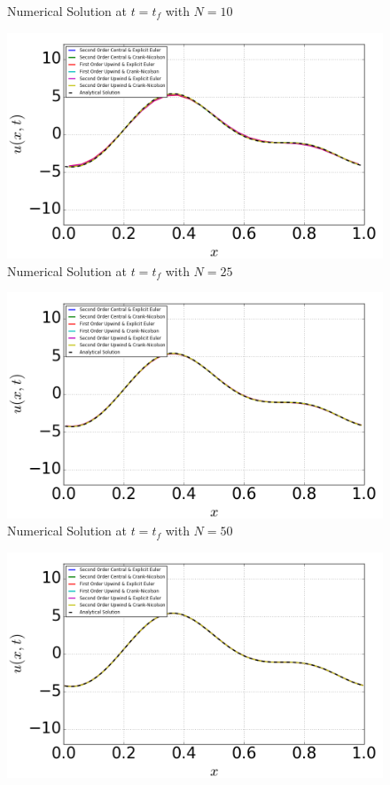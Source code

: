 \documentclass[12pt]{article}
\newenvironment{problem}[2][Problem]{\begin{trivlist}
\item[\hskip \labelsep {\bfseries #1}\hskip \labelsep {\bfseries #2.}]}{\end{trivlist}}
\begin{document}
\begin{problem}{2}
\begin{figure}[H]
 \caption{Numerical Solution at $t=t_f$ with $N=10$}
\label{label}
\end{figure}
\begin{figure}[H]
\centering
  \includegraphics[scale=0.65]{p2b_n25.png}
 \caption{Numerical Solution at $t=t_f$ with $N=25$}
\label{label}
\end{figure}
\begin{figure}[H]
\centering
  \includegraphics[scale=0.65]{p2b_n50.png}
 \caption{Numerical Solution at $t=t_f$ with $N=50$}
\label{label}
\end{figure}
\begin{figure}[H]
\centering
  \includegraphics[scale=0.65]{p2b_n100.png}

\end{figure}
\end{problem}
\end{document}
